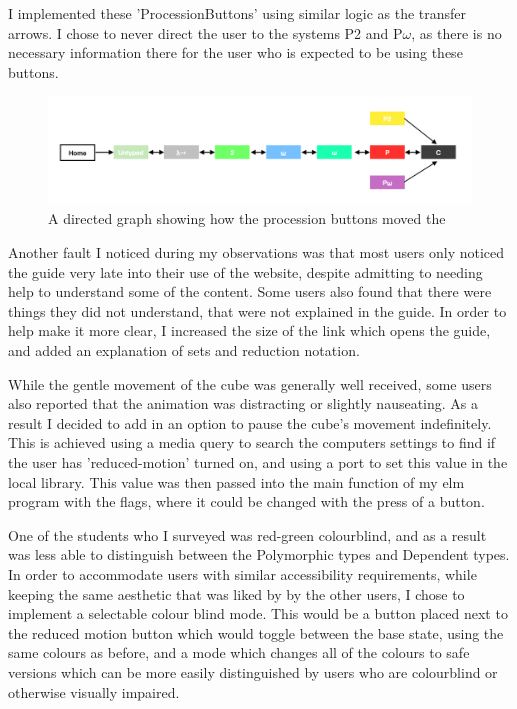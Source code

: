 \documentclass{l4proj}
\begin{document}
I implemented these 'ProcessionButtons' using similar logic as the transfer arrows.  I chose to never direct the user to the systems P2 and P\underline{$\omega$}, as there is no necessary information there for the user who is expected to be using these buttons.

\begin{figure}[h!]
    \centering
    \includegraphics[width=1\linewidth]{dissertation/images/arrows_graph.png}
    \caption{A directed graph showing how the procession buttons moved the}
    \label{fig:enter-label}
\end{figure}    

Another fault I noticed during my observations was that most users only noticed the guide very late into their use of the website, despite admitting to needing help to understand some of the content.  Some users also found that there were things they did not understand, that were not explained in the guide.  In order to help make it more clear, I increased the size of the link which opens the guide, and added an explanation of sets and reduction notation.

While the gentle movement of the cube was generally well received, some users also reported that the animation was distracting or slightly nauseating.  As a result I decided to add in an option to pause the cube's movement indefinitely.  This is achieved using a media query to search the computers settings to find if the user has 'reduced-motion' turned on, and using a port to set this value in the local library.  This value was then passed into the main function of my elm program with the flags, where it could be changed with the press of a button.

One of the students who I surveyed was red-green colourblind, and as a result was less able to distinguish between the Polymorphic types and Dependent types.  In order to accommodate users with similar accessibility requirements, while keeping the same aesthetic that was liked by by the other users, I chose to implement a selectable colour blind mode.  This would be a button placed next to the reduced motion button which would toggle between the base state, using the same colours as before, and a mode which changes all of the colours to safe versions which can be more easily distinguished by users who are colourblind or otherwise visually impaired.
\end{document}
